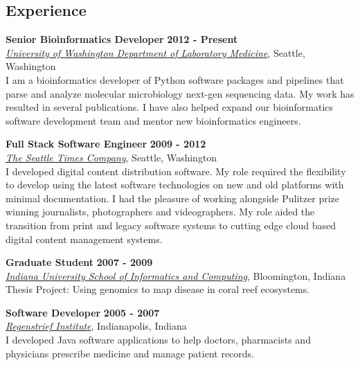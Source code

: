 \documentclass{res}
\begin{document}

\address{Seattle, Washington}
\address{crosenth@gmail.com}

\begin{resume}

\section{Experience}

\textbf{Senior Bioinformatics Developer} \hfill \textbf{2012 - Present}\\
\href{http://depts.washington.edu/labweb/}{\textit{University of Washington Department of Laboratory Medicine}},
Seattle, Washington\\
 I am a bioinformatics developer of Python software packages and pipelines that parse and analyze molecular microbiology 
 next-gen sequencing data. My work has resulted in several publications. I have also helped expand our bioinformatics 
 software development team and mentor new bioinformatics engineers.

\textbf{Full Stack Software Engineer} \hfill \textbf{2009 - 2012}\\
\href{http://www.seattletimes.com/}{\textit{The Seattle Times Company}}, Seattle, Washington\\
 I developed digital content distribution software. My role required the flexibility to develop using the latest software 
 technologies on new and old platforms with minimal documentation. I had the pleasure of working alongside Pulitzer prize 
 winning journalists, photographers and videographers. My role aided the transition from print and legacy software 
 systems to cutting edge cloud based digital content management systems.

\textbf{Graduate Student} \hfill \textbf{2007 - 2009}\\
\href{https://www.soic.indiana.edu/}{\textit{Indiana University School of Informatics and Computing}}, Bloomington, Indiana\\
Thesis Project: Using genomics to map disease in coral reef ecosystems.

\textbf{Software Developer} \hfill \textbf{2005 - 2007}\\
\href{http://www.regenstrief.org/}{\textit{Regenstrief Institute}}, Indianapolis, Indiana\\
	I developed Java software applications to help doctors, pharmacists and physicians 
  prescribe medicine and manage patient records.


\end{resume}
\end{document}
